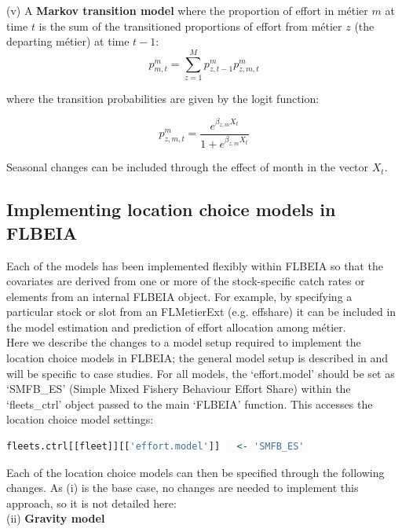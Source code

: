 \documentclass[12pt, halfline, a4paper]{ouparticle}
\begin{document}
(v) A \textbf{Markov transition model} where the proportion of effort in métier
$m$ at time $t$ is the sum of the transitioned proportions of effort from
métier $z$ (the departing métier) at time $t-1$:
\begin{equation}
p^m_{m,t} = \sum_{z = 1}^{M} p^m_{z, t-1} p^m_{z,m,t}
\end{equation}

where the transition probabilities are given by the logit function:

\begin{equation}
p^m_{z,m,t} = \frac{e^{\beta_{z,m} X_{t}}}{1+e^{\beta_{z,m} X_{t}}}
\end{equation}

Seasonal changes can be included through the effect of month in the vector
$X_t$. 

\subsection{Implementing location choice models in FLBEIA}
\label{sec:imp}

Each of the models has been implemented flexibly within FLBEIA so that the
covariates are derived from one or more of the stock-specific catch rates or
elements from an internal FLBEIA object. For example, by specifying a
particular stock or slot from an FLMetierExt (e.g. effshare) it can be included
in the model estimation and prediction of effort allocation among métier. \\

Here we describe the changes to a model setup required to implement the
location choice models in FLBEIA; the general model setup is described in
\cite{Garcia2017a} and will be specific to case studies. For all models, the
`effort.model' should be set as `SMFB\_ES' (Simple Mixed Fishery Behaviour
Effort Share) within the `fleets\_ctrl' object passed to the main `FLBEIA'
function. This accesses the location choice model settings:

\begin{lstlisting}[language=R]
fleets.ctrl[[fleet]][['effort.model']]   <- 'SMFB_ES'
\end{lstlisting} 

Each of the location choice models can then be specified through the following
changes. As (i) is the base case, no changes are needed to implement this
approach, so it is not detailed here: \\

(ii) \textbf{Gravity model} \\
\end{document}
